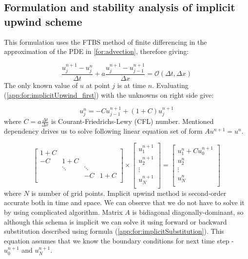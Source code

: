 \subsection{Formulation and stability analysis of implicit upwind scheme} \label{app:implicit}
	This formulation uses the FTBS method of finite differencing in the approximation of the PDE in \ref{for:advection}, therefore giving:
	
	\begin{equation}
		\label{app:for:implicitUpwind_first}
		\frac{u_j^{n+1} - u_j^n}{\Delta t} + a\frac{u_j^{n+1} - u_{j-1}^{n+1}}{\Delta x} = \mathcal{O}(\Delta t, \Delta x)
	\end{equation}	
	The only known value of $u$ at point $j$ is at time $n$. Evaluating (\ref{app:for:implicitUpwind_first}) with the unknowns on right side give:
	
	\begin{equation}
		\label{app:for:implicitUpwind_solution}
		u_j^n = -Cu_{j-1}^{n+1} + (1+C)u_j^{n+1}
	\end{equation}
	where $C=a\frac{\Delta t}{\Delta x}$ is Courant-Friedrichs-Lewy (CFL) number.
	Mentioned dependency drives us to solve following linear equation set of form $Au^{n+1} = u^n$.
	
	\begin{equation}
		\begin{bmatrix}
			1+C & & & \\
			-C & 1+C & & \\ 
			& \ddots & \ddots \\
			& & -C & 1+C \\					
		\end{bmatrix} 
		\times
		\begin{bmatrix}
			u_1^{n+1} \\
			u_2^{n+1} \\
			\vdots	\\
			u_N^{n+1}\\
		\end{bmatrix}
			=
		\begin{bmatrix}
			u_1^{n} + C u_0^{n+1}\\
			u_2^{n} \\
			\vdots	\\
			u_N^{n}\\
		\end{bmatrix}
	\end{equation} 	
	where $N$ is number of grid points.	
	Implicit upwind method is second-order accurate both in time and space. We can observe that we do not have to solve it by using complicated algorithm. Matrix $A$ is bidiagonal diagonally-dominant, so although this schema is implicit we can solve it using forward or backward substitution described using formula (\ref{app:for:implicitSubstitution}). This equation assumes that we know the boundary conditions for next time step - $u_0^{n+1}$ and $u_N^{n+1}$.
	
